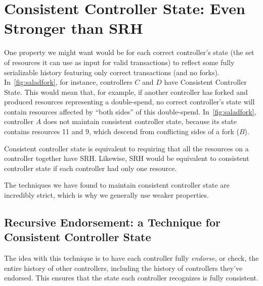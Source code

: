 \documentclass[a4paper,USenglish,cleveref, autoref, thm-restate, anonymous]{lipics-v2021}
\begin{document}
\section{Consistent Controller State: Even Stronger than SRH}
\label{sec:consistentcontrollerstate}
One property we might want would be for each correct controller's state (the set of resources it can use as input for valid transactions) to reflect some fully serializable history featuring only correct transactions (and no forks). 
In~\cref{fig:saladfork}, for instance, controllers $C$ and $D$ have Consistent Controller State.
This would mean that, for example, if another controller has forked and produced resources representing a double-spend, no correct controller's state will contain resources affected by ``both sides'' of this double-spend.
In~\cref{fig:saladfork}, controller $A$ does not maintain consistent controller state, because its state contains resources 11 and 9, which descend from conflicting sides of a fork ($B$).

Consistent controller state is equivalent to requiring that all the resources on a controller together have SRH.
Likewise, SRH would be equivalent to consistent controller state if each controller had only one resource.

The techniques we have found to maintain consistent controller state are incredibly strict, which is why we generally use weaker properties.

\subsection{Recursive Endorsement: a Technique for Consistent Controller State}
The idea with this technique is to have each controller fully \textit{endorse}, or check, the entire history of other controllers, including the history of controllers they've endorsed.
This ensures that the state each controller recognizes is fully consistent.
\end{document}
